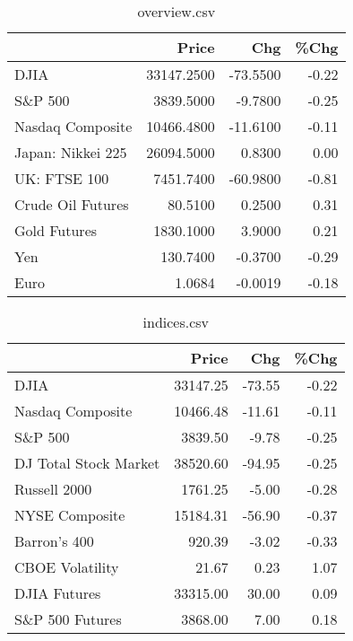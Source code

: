 \documentclass{article}%
\begin{document}
\begin{table}[htbp]%
\caption{overview.csv}%
\centering%
\begin{adjustbox}{width=1\textwidth}%
\begin{tabular}{lrrr}
\toprule
                  &      Price &      Chg &  \%Chg \\
\midrule
             DJIA & 33147.2500 & -73.5500 & -0.22 \\
          S\&P 500 &  3839.5000 &  -9.7800 & -0.25 \\
 Nasdaq Composite & 10466.4800 & -11.6100 & -0.11 \\
Japan: Nikkei 225 & 26094.5000 &   0.8300 &  0.00 \\
     UK: FTSE 100 &  7451.7400 & -60.9800 & -0.81 \\
Crude Oil Futures &    80.5100 &   0.2500 &  0.31 \\
     Gold Futures &  1830.1000 &   3.9000 &  0.21 \\
              Yen &   130.7400 &  -0.3700 & -0.29 \\
             Euro &     1.0684 &  -0.0019 & -0.18 \\
\bottomrule
\end{tabular}
%
\end{adjustbox}%
\end{table}

%


\begin{table}[htbp]%
\caption{indices.csv}%
\centering%
\begin{adjustbox}{width=1\textwidth}%
\begin{tabular}{lrrr}
\toprule
                      &    Price &    Chg &  \%Chg \\
\midrule
                 DJIA & 33147.25 & -73.55 & -0.22 \\
     Nasdaq Composite & 10466.48 & -11.61 & -0.11 \\
              S\&P 500 &  3839.50 &  -9.78 & -0.25 \\
DJ Total Stock Market & 38520.60 & -94.95 & -0.25 \\
         Russell 2000 &  1761.25 &  -5.00 & -0.28 \\
       NYSE Composite & 15184.31 & -56.90 & -0.37 \\
         Barron's 400 &   920.39 &  -3.02 & -0.33 \\
      CBOE Volatility &    21.67 &   0.23 &  1.07 \\
         DJIA Futures & 33315.00 &  30.00 &  0.09 \\
      S\&P 500 Futures &  3868.00 &   7.00 &  0.18 \\
\bottomrule
\end{tabular}
%
\end{adjustbox}%
\end{table}
\end{document}
